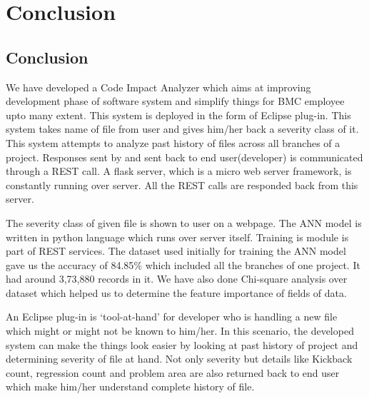 \documentclass[oneside,a4paper,12pt]{book}
\begin{document}
\chapter{Conclusion}

\section{Conclusion}


\begin{justify}
\tab We have developed a Code Impact Analyzer which aims at improving development phase of software system and simplify things for BMC employee upto many extent. This system is deployed in the form of Eclipse plug-in. This system takes name of file from user and gives him/her back a severity class of it. This system attempts to analyze past history of files across all branches of a project. Responses sent by and sent back to end user(developer) is communicated through a REST call. A flask server, which is a micro web server framework, is constantly running over server. All the REST calls are responded back from this server. 
\end{justify}\par

\begin{justify}
\tab The severity class of given file is shown to user on a webpage. The ANN model is written in python language which runs over server itself. Training is module is part of REST services. The dataset used initially for training the ANN model gave us the accuracy of 84.85$\%$  which included all the branches of one project. It had around 3,73,880 records in it. We have also done Chi-square analysis over dataset which helped us to determine the feature importance of fields of data.
\end{justify}\par

\begin{justify}
\tab An Eclipse plug-in is ‘tool-at-hand’ for developer who is handling a new file which might or might not be known to him/her. In this scenario, the developed system can make the things look easier by looking at past history of project and determining severity of file at hand. Not only severity but details like Kickback count, regression count and problem area are also returned back to end user which make him/her understand complete history of file. 
\end{justify}\par
\end{document}
